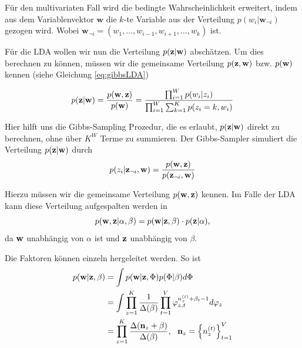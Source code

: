 Für den multivariaten Fall wird die bedingte Wahrscheinlichkeit erweitert, indem aus dem Variablenvektor $\mathbf{w}$ die $k$-te Variable aus der Verteilung $p(w_i|\mathbf{w}_{\neg i})$ gezogen wird. Wobei $\mathbf{w}_{\neg i} = (w_1,\ldots,w_{i-1},w_{i+1},\ldots,w_k)$ ist. 

Für die LDA wollen wir nun die Verteilung $p(\mathbf{z}|\mathbf{w})$ abschätzen. Um dies berechnen zu können, müssen wir die gemeinsame Verteilung $p(\mathbf{z},\mathbf{w})$ bzw. $p(\mathbf{w})$ kennen (siehe Gleichung \ref{eq:gibbsLDA})

\begin{align}
p(\mathbf{z}|\mathbf{w}) = \frac{p(\mathbf{w},\mathbf{z})}{p(\mathbf{w})} = \frac{\prod^W_{i=1}p(w_i|z_i)}{\prod^W_{i=1}\sum^K_{k=1}p(z_i=k,w_i)}
\label{eq:gibbsLDA}
\end{align}

Hier hilft uns die Gibbs-Sampling Prozedur, die es erlaubt, $p(\mathbf{z}|\mathbf{w})$ direkt zu berechnen, ohne über $K^W$ Terme zu summieren. Der Gibbs-Sampler simuliert die Verteilung $p(\mathbf{z}|\mathbf{w})$ durch 
\begin{equation}
p(z_i|\mathbf{z}_{\neg i }, \mathbf{w}) = \frac{p(\mathbf{w},\mathbf{z})}{p(\mathbf{z}_{\neg i},\mathbf{w})} 
\end{equation}

Hierzu müssen wir die gemeinsame Verteilung $p(\mathbf{w},\mathbf{z})$ kennen. Im Falle der LDA kann diese Verteilung aufgespalten werden in 
\begin{equation}
p(\mathbf{w},\mathbf{z}|\alpha,\beta) = p(\mathbf{w}|\mathbf{z},\beta)\cdot p(\mathbf{z}|\alpha)\text{,}
\end{equation}
da $\mathbf{w}$ unabhängig von $\alpha$ ist und $\mathbf{z}$ unabhängig von $\beta$.

Die Faktoren können einzeln hergeleitet werden. So ist 
\begin{align}
p(\doc|\docTopic,\beta) &= \int p(\doc|\docTopic,\Phi) p(\Phi|\beta) d\Phi \notag \\
                        &= \int \prod^K_{z=1}\frac{1}{\Delta(\beta)} \prod^V_{t=1}\topicTermProb{z}{t}^{n^{(t)}_z+\beta_t-1} d\topicTermDist{z} \label{eq:ldaGibbsIntegral1}\\
                        &= \prod^K_{z=1}\frac{\Delta(\mathbf{n}_z+\beta)}{\Delta(\beta)}, \ \ \mathbf{n}_z=\left\lbrace n_z^{(t)}\right\rbrace^V_{t=1} \label{eq:ldaGibbsIntegral2}
\end{align}

